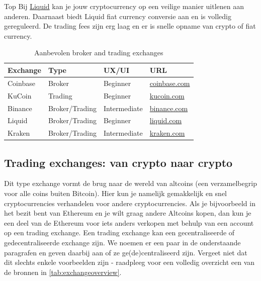 \begin{topbox}{Top}
Bij \href{https://www.liquid.com?affiliate=nUfQhVL4164547}{Liquid} kan je jouw cryptocurrency op een veilige manier uitlenen aan anderen. Daarnaast biedt Liquid fiat currency conversie aan en is volledig gereguleerd. De trading fees zijn erg laag en er is snelle opname van crypto of fiat currency.
\end{topbox}

\begin{table}[b]

\centering

\caption{Aanbevolen broker and trading exchanges}
\begin{tabular}{llll} 
\toprule

\textbf{Exchange} & \textbf{Type } & \textbf{UX/UI} & \textbf{URL}\\
\midrule

Coinbase & Broker & Beginner & \href{https://www.coinbase.com/join/51954a2b26a1bcc484000015}{coinbase.com} \\
KuCoin   &  Trading & Beginner & \href{https://www.kucoin.com/#/?r=aNuPeb}{kucoin.com} \\
Binance  &  Broker/Trading & Intermediate & \href{https://www.binance.com/?ref=35602166}{binance.com} \\
Liquid   &  Broker/Trading & Beginner & \href{https://www.liquid.com?affiliate=nUfQhVL4164547}{liquid.com} \\
Kraken   &  Broker/Trading & Intermediate & \href{https://www.kraken.com/}{kraken.com} \\


\bottomrule
\end{tabular}
\label{tab:exchange selection}
\end{table}

\subsection{Trading exchanges: van crypto naar crypto}
\label{subsec:trading_exchange}

Dit type exchange vormt de brug naar de wereld van altcoins (een verzamelbegrip voor alle coins buiten Bitcoin). Hier kun je namelijk gemakkelijk en snel cryptocurrencies verhandelen voor andere cryptocurrencies. Als je bijvoorbeeld in het bezit bent van Ethereum en je wilt graag andere Altcoins kopen, dan kun je een deel van de Ethereum voor iets anders verkopen met behulp van een account op een trading exchange. Een trading exchange kan een gecentraliseerde of gedecentraliseerde exchange zijn. We noemen er een paar in de onderstaande paragrafen en geven daarbij aan of ze ge(de)centraliseerd zijn. Vergeet niet dat dit slechts enkele voorbeelden zijn - raadpleeg voor een volledig overzicht een van de bronnen in \cref{tab:exchangeoverview}.

